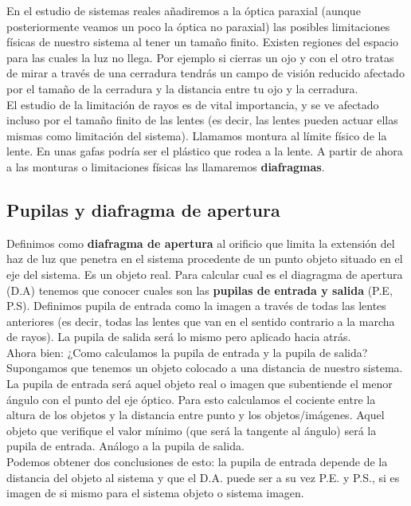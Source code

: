 \documentclass[12pt]{article}
\numberwithin{equation}{section}
\numberwithin{figure}{section}
\begin{document}
En el estudio de sistemas reales añadiremos a la óptica paraxial (aunque posteriormente veamos un poco la óptica no paraxial) las posibles limitaciones físicas de nuestro sistema al tener un tamaño finito. Existen regiones del espacio para las cuales la luz no llega. Por ejemplo si cierras un ojo y con el otro tratas de mirar a través de una cerradura tendrás un campo de visión reducido afectado por el tamaño de la cerradura y la distancia entre tu ojo y la cerradura. \\

El estudio de la limitación de rayos es de vital importancia, y se ve afectado incluso por el tamaño finito de las lentes (es decir, las lentes pueden actuar ellas mismas como limitación del sistema). Llamamos montura al límite físico de la lente. En unas gafas podría ser el plástico que rodea a la lente. A partir de ahora a las monturas o limitaciones físicas las llamaremos \textbf{diafragmas}. \\

\subsection{Pupilas y diafragma de apertura}

Definimos como \textbf{diafragma de apertura} al orificio que limita la extensión del haz de luz que penetra en el sistema procedente de un punto objeto situado en el eje del sistema. Es un objeto real. Para calcular cual es el diagragma de apertura (D.A) tenemos que conocer cuales son las \textbf{pupilas de entrada y salida} (P.E, P.S). Definimos pupila de entrada como la imagen a través de todas las lentes anteriores (es decir, todas las lentes que van en el sentido contrario a la marcha de rayos). La pupila de salida será lo mismo pero aplicado hacia atrás. \\

Ahora bien: ¿Como calculamos la pupila de entrada y la pupila de salida? Supongamos que tenemos un objeto colocado a una distancia de nuestro sistema. La pupila de entrada será aquel objeto real o imagen que subentiende el menor ángulo con el punto del eje óptico. Para esto calculamos el cociente entre la altura de los objetos y la distancia entre punto y los objetos/imágenes. Aquel objeto que verifique el valor mínimo (que será la tangente al ángulo) será la pupila de entrada. Análogo a la pupila de salida. \\

Podemos obtener dos conclusiones de esto: la pupila de entrada depende de la distancia del objeto al sistema y que el D.A. puede ser a su vez P.E. y P.S., si es imagen de si mismo para el sistema objeto o sistema imagen. \\
\end{document}

